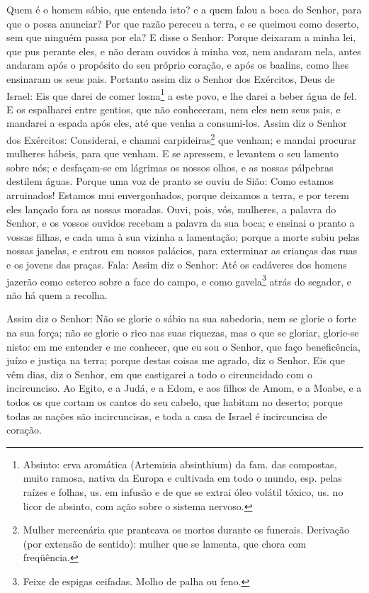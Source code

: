 Quem é o homem sábio, que entenda isto? e a quem falou a boca do
Senhor, para que o possa anunciar? Por que razão pereceu a terra, e
se queimou como deserto, sem que ninguém passa por ela? E
disse o Senhor: Porque deixaram a minha lei, que pus perante eles, e
não deram ouvidos à minha voz, nem andaram nela, antes
andaram após o propósito do seu próprio coração, e após os baalins,
como lhes ensinaram os seus pais. Portanto assim diz o Senhor
dos Exércitos, Deus de Israel: Eis que darei de comer
losna\footnote{Absinto: erva aromática (Artemisia absinthium) da
fam. das compostas, muito ramosa, nativa da Europa e cultivada em
todo o mundo, esp. pelas raízes e folhas, us. em infusão e de que se
extrai óleo volátil tóxico, us. no licor de absinto, com ação sobre
o sistema nervoso.} a este povo, e lhe darei a beber água de fel.
E os espalharei entre gentios, que não conheceram, nem eles
nem seus pais, e mandarei a espada após eles, até que venha a
consumi-los. Assim diz o Senhor dos Exércitos: Considerai, e
chamai carpideiras\footnote{Mulher mercenária que pranteava os
mortos durante os funerais. Derivação (por extensão de sentido):
mulher que se lamenta, que chora com freqüência.} que venham; e
mandai procurar mulheres hábeis, para que venham. E se
apressem, e levantem o seu lamento sobre nós; e desfaçam-se em
lágrimas os nossos olhos, e as nossas pálpebras destilem águas.
Porque uma voz de pranto se ouviu de Sião: Como estamos
arruinados! Estamos mui envergonhados, porque deixamos a terra, e
por terem eles lançado fora as nossas moradas. Ouvi, pois,
vós, mulheres, a palavra do Senhor, e os vossos ouvidos recebam a
palavra da sua boca; e ensinai o pranto a vossas filhas, e cada uma
à sua vizinha a lamentação; porque a morte subiu pelas nossas
janelas, e entrou em nossos palácios, para exterminar as crianças
das ruas e os jovens das praças. Fala: Assim diz o Senhor:
Até os cadáveres dos homens jazerão como esterco sobre a face do
campo, e como gavela\footnote{Feixe de espigas ceifadas. Molho de
palha ou feno.} atrás do segador, e não há quem a recolha.

Assim diz o Senhor: Não se glorie o sábio na sua sabedoria, nem
se glorie o forte na sua força; não se glorie o rico nas suas
riquezas, mas o que se gloriar, glorie-se nisto: em me
entender e me conhecer, que eu sou o Senhor, que faço beneficência,
juízo e justiça na terra; porque destas coisas me agrado, diz o
Senhor. Eis que vêm dias, diz o Senhor, em que castigarei a
todo o circuncidado com o incircunciso. Ao Egito, e a Judá, e
a Edom, e aos filhos de Amom, e a Moabe, e a todos os que cortam os
cantos do seu cabelo, que habitam no deserto; porque todas as nações
são incircuncisas, e toda a casa de Israel é incircuncisa de
coração.

